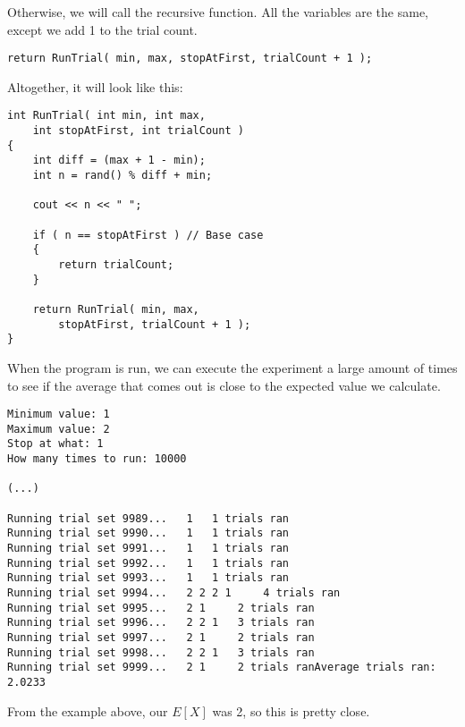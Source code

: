 \documentclass[a4paper,12pt]{book}
\begin{document}
    Otherwise, we will call the recursive function.
    All the variables are the same, except we add 1 to the trial count.
    
\begin{verbatim}
return RunTrial( min, max, stopAtFirst, trialCount + 1 );
\end{verbatim}

    Altogether, it will look like this:

\begin{lstlisting}[style=code]
int RunTrial( int min, int max,
    int stopAtFirst, int trialCount )
{
    int diff = (max + 1 - min);
    int n = rand() % diff + min;

    cout << n << " ";
    
    if ( n == stopAtFirst ) // Base case
    {
        return trialCount;
    }

    return RunTrial( min, max,
        stopAtFirst, trialCount + 1 );
}
\end{lstlisting}

\newpage

    When the program is run, we can execute the experiment a large
    amount of times to see if the average that comes out is close
    to the expected value we calculate.
    
\begin{lstlisting}[style=output]
Minimum value: 1
Maximum value: 2
Stop at what: 1
How many times to run: 10000

(...)

Running trial set 9989... 	1 	1 trials ran
Running trial set 9990... 	1 	1 trials ran
Running trial set 9991... 	1 	1 trials ran
Running trial set 9992... 	1 	1 trials ran
Running trial set 9993... 	1 	1 trials ran
Running trial set 9994... 	2 2 2 1 	4 trials ran
Running trial set 9995... 	2 1 	2 trials ran
Running trial set 9996... 	2 2 1 	3 trials ran
Running trial set 9997... 	2 1 	2 trials ran
Running trial set 9998... 	2 2 1 	3 trials ran
Running trial set 9999... 	2 1 	2 trials ranAverage trials ran: 2.0233
\end{lstlisting}

From the example above, our $E[X]$ was 2, so this is pretty close.
\end{document}
